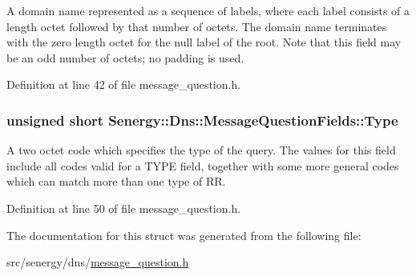 A domain name represented as a sequence of labels, where each label consists of a length octet followed by that number of octets. The domain name terminates with the zero length octet for the null label of the root. Note that this field may be an odd number of octets; no padding is used. 



Definition at line 42 of file message\-\_\-question.\-h.

\hypertarget{struct_senergy_1_1_dns_1_1_message_question_fields_a15156bfecd74744319a3ce51e3fd1800}{
\subsubsection[{Type}]{\setlength{\rightskip}{0pt plus 5cm}unsigned short Senergy\-::\-Dns\-::\-Message\-Question\-Fields\-::\-Type}}\label{struct_senergy_1_1_dns_1_1_message_question_fields_a15156bfecd74744319a3ce51e3fd1800}


A two octet code which specifies the type of the query. The values for this field include all codes valid for a T\-Y\-P\-E field, together with some more general codes which can match more than one type of R\-R. 



Definition at line 50 of file message\-\_\-question.\-h.



The documentation for this struct was generated from the following file\-:\begin{DoxyCompactItemize}
\item 
src/senergy/dns/\hyperlink{message__question_8h}{message\-\_\-question.\-h}\end{DoxyCompactItemize}
